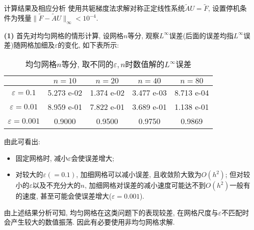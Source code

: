 \documentclass{article}
\begin{document}
\begin{section}{计算结果及相应分析}
    使用共轭梯度法求解对称正定线性系统$\tilde{A}U=\tilde{F}$, 设置停机条件为残量$\|\tilde{F}-\tilde{A}U\|_\infty<10^{-4}$.
    
    \noindent\textbf{(1)} 首先对均匀网格的情形计算, 设网格$n$等分, 观察$L^\infty$误差(后面的误差均指$L^\infty$误差)随网格加细及$\varepsilon$的变化, 如下表所示:
    \begin{table}[!htbp]
        \centering
        \begin{tabular}{c|cccc}\hline
                            & $n=10$     & $n=20$     & $n=40$     & $n=80$     \\ \hline
        $\varepsilon=0.1$   & 5.273 e-02 & 1.374 e-02 & 3.477 e-03 & 8.713 e-04 \\
        $\varepsilon=0.01$  & 8.959 e-01 & 7.822 e-01 & 3.689 e-01 & 1.138 e-01 \\
        $\varepsilon=0.001$ & 0.9000 & 0.9500 & 0.9750 & 0.9869 \\ \hline
        \end{tabular}
        \caption{均匀网格$n$等分, 取不同的$\varepsilon,n$时数值解的$L^\infty$误差} 
        \end{table}

    由此可看出:
    \begin{itemize}
        \item 固定网格时, 减小$\varepsilon$会使误差增大;
        \item 对较大的$\varepsilon(=0.1)$, 加细网格可以减小误差, 且收敛阶大致为$O(h^2)$; 但对较小的$\varepsilon$以及不充分大的$n$, 
                加细网格对误差的减小速度可能达不到$O(h^2)$一般有的速度, 甚至可能会使误差增大($\varepsilon=0.001$).
    \end{itemize}
    
    由上述结果分析可知, 均匀网格在这类问题下的表现较差, 在网格尺度与$\varepsilon$不匹配时会产生较大的数值振荡. 因此有必要使用非均匀网格求解.

    \


\end{section}
\end{document}
